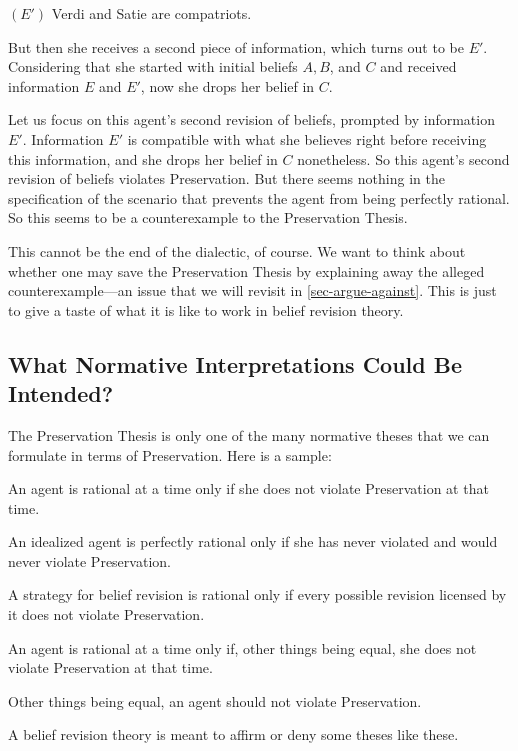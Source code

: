 	\xm $(E')$ Verdi and Satie are compatriots.

\ed But then she receives a second piece of information, which turns out to be $E'$. Considering that she started with initial beliefs $A, B$, and $C$ and received information $E$ and $E'$, now she drops her belief in $C$. 

\ed Let us focus on this agent's second revision of beliefs, prompted by information $E'$. Information $E'$ is compatible with what she believes right before receiving this information, and she drops her belief in $C$ nonetheless. So this agent's second revision of beliefs violates Preservation. But there seems nothing in the specification of the scenario that prevents the agent from being perfectly rational. So this seems to be a counterexample to the Preservation Thesis.

This cannot be the end of the dialectic, of course. We want to think about whether one may save the Preservation Thesis by explaining away the alleged counterexample---an issue that we will revisit in \autoref{sec-argue-against}. This is just to give a taste of what it is like to work in belief revision theory.



\subsection{What Normative Interpretations Could Be Intended?}\label{sec-interpretations}

The Preservation Thesis is only one of the many normative theses that we can formulate in terms of Preservation. Here is a sample:\op

	\xm\op
	\im[($T_1$)] An agent is rational at a time only if she does not violate Preservation at that time.

	\im[($T_2$)] An idealized agent is perfectly rational only if she has never violated and would never violate Preservation.

	\im[($T_3$)] A strategy for belief revision is rational only if every possible revision licensed by it does not violate Preservation. 

	\im[($T_4$)] An agent is rational at a time only if, other things being equal, she does not violate Preservation at that time.

	\im[($T_5$)] Other things being equal, an agent should not violate Preservation.
	\ed

\ed A belief revision theory is meant to affirm or deny some theses like these.

